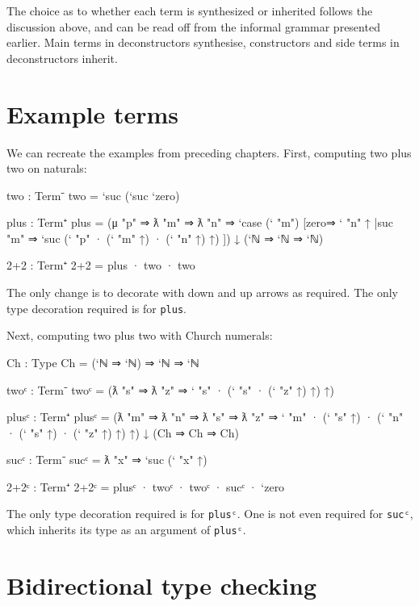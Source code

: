 The choice as to whether each term is synthesized or inherited follows
the discussion above, and can be read off from the informal grammar
presented earlier. Main terms in deconstructors synthesise, constructors
and side terms in deconstructors inherit.

\hypertarget{example-terms}{%
\section{Example terms}\label{example-terms}}

We can recreate the examples from preceding chapters. First, computing
two plus two on naturals:

\begin{fence}
\begin{code}
two : Term⁻
two = `suc (`suc `zero)

plus : Term⁺
plus = (μ "p" ⇒ ƛ "m" ⇒ ƛ "n" ⇒
          `case (` "m") [zero⇒ ` "n" ↑
                        |suc "m" ⇒ `suc (` "p" · (` "m" ↑) · (` "n" ↑) ↑) ])
            ↓ (`ℕ ⇒ `ℕ ⇒ `ℕ)

2+2 : Term⁺
2+2 = plus · two · two
\end{code}
\end{fence}

The only change is to decorate with down and up arrows as required. The
only type decoration required is for \texttt{plus}.

Next, computing two plus two with Church numerals:

\begin{fence}
\begin{code}
Ch : Type
Ch = (`ℕ ⇒ `ℕ) ⇒ `ℕ ⇒ `ℕ

twoᶜ : Term⁻
twoᶜ = (ƛ "s" ⇒ ƛ "z" ⇒ ` "s" · (` "s" · (` "z" ↑) ↑) ↑)

plusᶜ : Term⁺
plusᶜ = (ƛ "m" ⇒ ƛ "n" ⇒ ƛ "s" ⇒ ƛ "z" ⇒
           ` "m" · (` "s" ↑) · (` "n" · (` "s" ↑) · (` "z" ↑) ↑) ↑)
             ↓ (Ch ⇒ Ch ⇒ Ch)

sucᶜ : Term⁻
sucᶜ = ƛ "x" ⇒ `suc (` "x" ↑)

2+2ᶜ : Term⁺
2+2ᶜ = plusᶜ · twoᶜ · twoᶜ · sucᶜ · `zero
\end{code}
\end{fence}

The only type decoration required is for \texttt{plusᶜ}. One is not even
required for \texttt{sucᶜ}, which inherits its type as an argument of
\texttt{plusᶜ}.

\hypertarget{bidirectional-type-checking}{%
\section{Bidirectional type
checking}\label{bidirectional-type-checking}}

